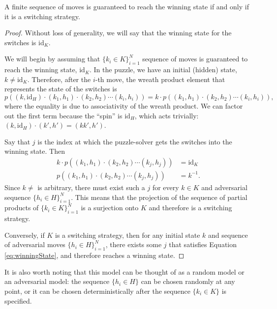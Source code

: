 \begin{proposition}
  A finite sequence of moves is guaranteed to reach the winning
  state if and only if it is a switching strategy.
\end{proposition}
\begin{proof}
  Without loss of generality, we will say that the winning state for the switches is
  $\mathrm{id}_K$.

  We will begin by assuming that $\{k_i \in K\}_{i=1}^N$ sequence of moves is
  guaranteed to reach the winning state, $\mathrm{id}_K$.
  In the puzzle, we have an initial (hidden) state, $k \neq \mathrm{id}_K$.
  Therefore, after the $i$-th move,
  the wreath product element that represents the state of the switches is
  \begin{equation}
    p\left((k, \mathrm{id}_H)\cdot(k_1, h_1)\cdot(k_2, h_2)\cdots(k_i, h_i)\right)
    = k \cdot p\left((k_1, h_1)\cdot(k_2, h_2)\cdots(k_i, h_i)\right),
  \end{equation}
  where the equality is due to associativity of the wreath product.
  We can factor out the first term because the ``spin'' is $\mathrm{id}_H$,
  which acts trivially:
  ${(k, \mathrm{id}_H) \cdot (k', h') = (kk', h')}$.

  Say that $j$ is the index at which the puzzle-solver gets the switches into
  the winning state. Then \begin{align}
    k \cdot p\left((k_1, h_1)\cdot(k_2, h_2)\cdots(k_j, h_j)\right) &= \mathrm{id}_K
    \\
            p\left((k_1, h_1)\cdot(k_2, h_2)\cdots(k_j, h_j)\right) &= k^{-1}.
    \label{eq:winningState}
  \end{align}
  Since $k \neq$ is arbitrary, there must exist such a $j$ for every $k \in K$
  and adversarial sequence $\{h_i \in H\}_{i=1}^N$. This means that the
  projection of the sequence of partial products of $\{k_i \in K\}_{i=1}^N$ is
  a surjection onto $K$ and therefore is a switching strategy.

  Conversely, if $K$ is a switching strategy, then for any initial state $k$ and sequence of
  adversarial moves $\{h_i \in H\}_{i=1}^N$, there exists some $j$ that
  satisfies Equation \eqref{eq:winningState}, and therefore reaches a winning
  state.
\end{proof}

It is also worth noting that this model can be thought of as a random model or an
adversarial model: the sequence $\{h_i \in H\}$ can be chosen
randomly at any point, or it can be chosen deterministically
after the sequence $\{k_i \in K\}$ is specified.

